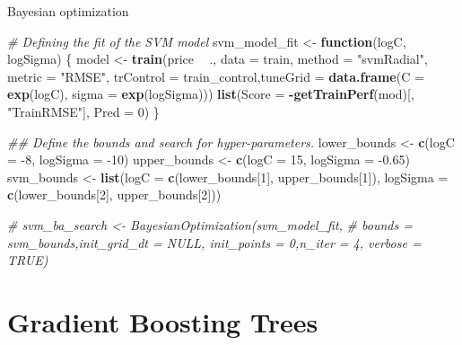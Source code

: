 \documentclass[12pt,ignorenonframetext,]{beamer}
\newenvironment{Shaded}{\begin{snugshade}}{\end{snugshade}}
\newcommand{\CommentTok}[1]{\textcolor[rgb]{0.56,0.35,0.01}{\textit{#1}}}
\newcommand{\ControlFlowTok}[1]{\textcolor[rgb]{0.13,0.29,0.53}{\textbf{#1}}}
\newcommand{\DataTypeTok}[1]{\textcolor[rgb]{0.13,0.29,0.53}{#1}}
\newcommand{\DecValTok}[1]{\textcolor[rgb]{0.00,0.00,0.81}{#1}}
\newcommand{\FloatTok}[1]{\textcolor[rgb]{0.00,0.00,0.81}{#1}}
\newcommand{\KeywordTok}[1]{\textcolor[rgb]{0.13,0.29,0.53}{\textbf{#1}}}
\newcommand{\NormalTok}[1]{#1}
\newcommand{\OperatorTok}[1]{\textcolor[rgb]{0.81,0.36,0.00}{\textbf{#1}}}
\newcommand{\StringTok}[1]{\textcolor[rgb]{0.31,0.60,0.02}{#1}}
\begin{document}
\begin{frame}[fragile]{Bayesian optimization}
\protect\hypertarget{bayesian-optimization-1}{}

\tiny

\begin{Shaded}
\begin{Highlighting}[]
\CommentTok{# Defining the fit of the SVM model}
\NormalTok{svm_model_fit <-}\StringTok{ }\ControlFlowTok{function}\NormalTok{(logC, logSigma) \{}
\NormalTok{  model <-}\StringTok{ }\KeywordTok{train}\NormalTok{(price }\OperatorTok{~}\StringTok{ }\NormalTok{., }\DataTypeTok{data =}\NormalTok{ train, }\DataTypeTok{method =} \StringTok{"svmRadial"}\NormalTok{, }\DataTypeTok{metric =} \StringTok{"RMSE"}\NormalTok{,}
                  \DataTypeTok{trControl =}\NormalTok{ train_control,}\DataTypeTok{tuneGrid =} \KeywordTok{data.frame}\NormalTok{(}\DataTypeTok{C =} \KeywordTok{exp}\NormalTok{(logC), }\DataTypeTok{sigma =} \KeywordTok{exp}\NormalTok{(logSigma)))}
  \KeywordTok{list}\NormalTok{(}\DataTypeTok{Score =} \OperatorTok{-}\KeywordTok{getTrainPerf}\NormalTok{(mod)[, }\StringTok{"TrainRMSE"}\NormalTok{], }\DataTypeTok{Pred =} \DecValTok{0}\NormalTok{)}
\NormalTok{\}}

\CommentTok{## Define the bounds and search for hyper-parameters.}
\NormalTok{lower_bounds <-}\StringTok{ }\KeywordTok{c}\NormalTok{(}\DataTypeTok{logC =} \DecValTok{-8}\NormalTok{, }\DataTypeTok{logSigma =} \DecValTok{-10}\NormalTok{)}
\NormalTok{upper_bounds <-}\StringTok{ }\KeywordTok{c}\NormalTok{(}\DataTypeTok{logC =} \DecValTok{15}\NormalTok{, }\DataTypeTok{logSigma =} \FloatTok{-0.65}\NormalTok{)}
\NormalTok{svm_bounds <-}\StringTok{ }\KeywordTok{list}\NormalTok{(}\DataTypeTok{logC =} \KeywordTok{c}\NormalTok{(lower_bounds[}\DecValTok{1}\NormalTok{], upper_bounds[}\DecValTok{1}\NormalTok{]), }
                   \DataTypeTok{logSigma =} \KeywordTok{c}\NormalTok{(lower_bounds[}\DecValTok{2}\NormalTok{], upper_bounds[}\DecValTok{2}\NormalTok{]))}

\CommentTok{# svm_ba_search <- BayesianOptimization(svm_model_fit,}
\CommentTok{#    bounds = svm_bounds,init_grid_dt = NULL, init_points = 0,n_iter = 4, verbose = TRUE)}
\end{Highlighting}
\end{Shaded}

\normalsize

\end{frame}

\hypertarget{gradient-boosting-trees}{%
\section{Gradient Boosting Trees}\label{gradient-boosting-trees}}
\end{document}
